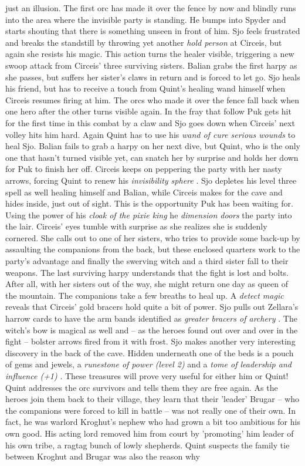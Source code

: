 just an illusion. The first orc has made it over the fence by now and blindly runs into the area where the invisible party is standing. He bumps into Spyder and starts shouting that there is something unseen in front of him. Sjo feels frustrated and breaks the standstill by throwing yet another {\itshape hold person} at Circeis, but again she resists his magic. This action turns the healer visible, triggering a new swoop attack from Circeis' three surviving sisters. Balian grabs the first harpy as she passes, but suffers her sister's claws in return and is forced to let go. Sjo heals his friend, but has to receive a touch from Quint's healing wand himself when Circeis resumes firing at him. The orcs who made it over the fence fall back when one hero after the other turns visible again. In the fray that follow Puk gets hit for the first time in this combat by a claw and Sjo goes down when Circeis' next volley hits him hard. Again Quint has to use his  {\itshape wand of cure serious wounds} to heal Sjo. Balian fails to grab a harpy on her next dive, but Quint, who is the only one that hasn't turned visible yet, can snatch her by surprise and holds her down for Puk to finish her off. Circeis keeps on peppering the party with her nasty arrows, forcing Quint to renew his  {\itshape invisibility sphere} . Sjo depletes his level three spell as well healing himself and Balian, while Circeis makes for the cave and hides inside, just out of sight. This is the opportunity Puk has been waiting for. Using the power of his {\itshape cloak of the pixie king} he  {\itshape dimension doors} the party into the lair. Circeis' eyes tumble with surprise as she realizes she is suddenly cornered. She calls out to one of her sisters, who tries to provide some back-up by assaulting the companions from the back, but these enclosed quarters work to the party's advantage and finally the swerving witch and a third sister fall to their weapons. The last surviving harpy understands that the fight is lost and bolts. After all, with her sisters out of the way, she might return one day as queen of the mountain. The companions take a few breaths to heal up. A {\itshape detect magic} reveals that Circeis' gold bracers hold quite a bit of power. Sjo pulls out Zellara's harrow cards to have the arm bands identified as  {\itshape greater bracers of archery} . The witch's bow is magical as well and -- as the heroes found out over and over in the fight -- bolster arrows fired from it with frost. Sjo makes another very interesting discovery in the back of the cave. Hidden underneath one of the beds is a pouch of gems and jewels, a  {\itshape runestone of power (level 2)} and a  {\itshape tome of leadership and influence (+1)} . These treasures will prove very useful for either him or Quint! Quint addresses the orc survivors and tells them they are free again. As the heroes join them back to their village, they learn that their 'leader' Brugar -- who the companions were forced to kill in battle -- was  not really one of their own. In fact, he was warlord Kroghut's nephew who had grown a bit too ambitious for his own good. His acting lord removed him from court by 'promoting' him leader of his own tribe, a ragtag bunch of lowly shepherds. Quint suspects the family tie between Kroghut and Brugar was also the reason why 